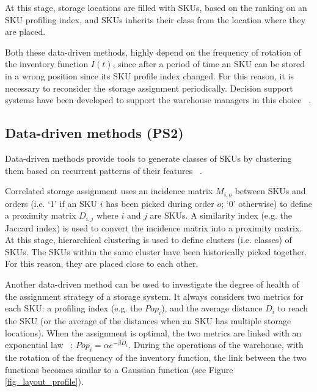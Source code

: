 At this stage, storage locations are filled with SKUs, based on the ranking on an SKU profiling index, and SKUs inherits their class from the location where they are placed. \par

Both these data-driven methods, highly depend on the frequency of rotation of the inventory function $I(t)$, since after a period of time an SKU can be stored in a wrong position since its SKU profile index changed. For this reason, it is necessary to reconsider the storage assignment periodically. Decision support systems have been developed to support the warehouse managers in this choice ~\cite{Accorsi2014}.

\subsection{Data-driven methods (PS2)}

Data-driven methods provide tools to generate classes of SKUs by clustering them based on recurrent patterns of their features ~\cite{Bindi2009, Brynzer1996, Liu1999, Chiang2013, Moshref-Javadi2016, Pang2017, Smith2012, Xiao2012}.\par

Correlated storage assignment uses an incidence matrix $M_{i,o}$ between SKUs and orders (i.e. ‘1’ if an SKU $i$ has been picked during order $o$; ‘0’ otherwise) to define a proximity matrix $D_{i,j}$ where $i$ and $j$ are SKUs. A similarity index (e.g. the Jaccard index) is used to convert the incidence matrix into a proximity matrix. At this stage, hierarchical clustering is used to define clusters (i.e. classes) of SKUs. The SKUs within the same cluster have been historically picked together. For this reason, they are placed close to each other.\par

Another data-driven method can be used to investigate the degree of health of the assignment strategy of a storage system. It always considers two metrics for each SKU: a profiling index (e.g. the $Pop_i$), and the average distance $D_i$ to reach the SKU (or the average of the distances when an SKU has multiple storage locations). When the assignment is optimal, the two metrics are linked with an exponential law ~\cite{Manzini2018}: $Pop_i=\alpha e^{-\beta D_i}$. During the operations of the warehouse, with the rotation of the frequency of the inventory function, the link between the two functions becomes similar to a Gaussian function (see Figure \ref{fig_layout_profile}). \par

